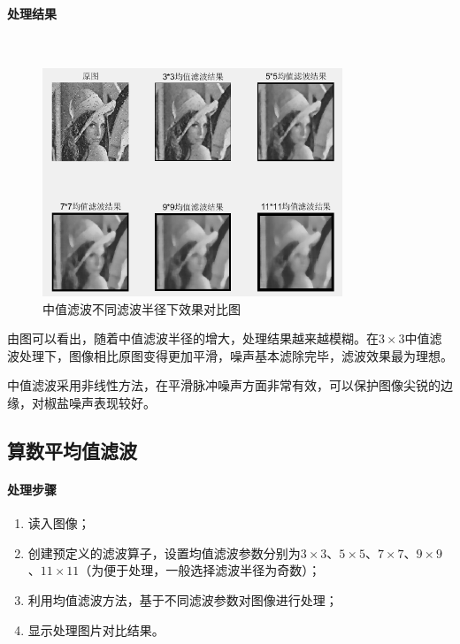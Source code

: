 \documentclass[UTF8]{article}
\begin{document}
\paragraph{处理结果}~{}
\begin{figure}[H]
    \centering %
    \includegraphics[width=0.8\textwidth]{figure/中值滤波结果.png} 
    \caption{中值滤波不同滤波半径下效果对比图} %
\end{figure}
由图可以看出，随着中值滤波半径的增大，处理结果越来越模糊。在$3 \times 3$中值滤波处理下，图像相比原图变得更加平滑，噪声基本滤除完毕，滤波效果最为理想。

中值滤波采用非线性方法，在平滑脉冲噪声方面非常有效，可以保护图像尖锐的边缘，对椒盐噪声表现较好。

\subsection{算数平均值滤波}
\paragraph{处理步骤}
\begin{enumerate}
    \item 读入图像；
    \item 创建预定义的滤波算子，设置均值滤波参数分别为$3 \times 3$、$5 \times 5$、$7 \times 7$、$9 \times 9$、$11 \times 11$（为便于处理，一般选择滤波半径为奇数）；
    \item 利用均值滤波方法，基于不同滤波参数对图像进行处理；
    \item 显示处理图片对比结果。
\end{enumerate}
\end{document}
